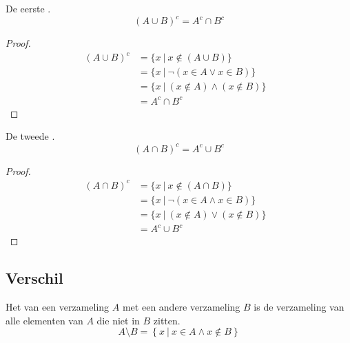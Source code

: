 \documentclass[main.tex]{subfiles}
\begin{document}
\begin{st}
  De eerste .
  \[ (A \cup B)^{c} = A^{c} \cap B^{c} \]

  \begin{proof}
    \[
    \begin{array}{rll}
    (A \cup B)^{c} &= \{ x\ |\ x \not\in (A\cup B) \}&\\
                   &= \{ x\ |\ \neg(x \in A \vee x \in B) \}&\\
                   &= \{ x\ |\ (x \not\in A)\wedge (x \not\in B) \}&\\
                   &= A^{c} \cap B^{c}
    \end{array}
    \]
  \end{proof}
\end{st}

\begin{st}
  De tweede .
  \[ (A \cap B)^{c} = A^{c} \cup B^{c} \]

  \begin{proof}
    \[
    \begin{array}{rll}
      (A \cap B)^{c} &= \{ x\ |\ x \not\in (A\cap B) \}&\\
                     &= \{ x\ |\ \neg(x \in A \wedge x \in B) \}&\\
                     &= \{ x\ |\ (x \not\in A)\vee (x \not\in B) \}&\\
                     &= A^{c} \cup B^{c}
    \end{array}
    \]
  \end{proof}
\end{st}

\subsection{Verschil}
\label{sec:verschil}

\begin{de}
  Het  van een verzameling $A$ met een andere verzameling $B$ is de verzameling van alle elementen van $A$ die niet in $B$ zitten.
  \[ A \setminus B = \left\{ x\ |\ x \in A \wedge x \not\in B \right\} \]
\end{de}
\end{document}
